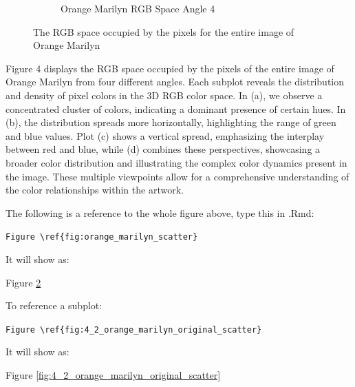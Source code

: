 \documentclass{article}
\begin{document}
\begin{figure}[ht]
\begin{subfigure}{0.24\textwidth}
    \caption{Orange Marilyn RGB Space Angle 4}
    \label{fig:4_4_orange_marilyn_original_scatter}
  \end{subfigure}
  \caption{The RGB space occupied by the pixels for the entire image of Orange Marilyn}
  \label{fig:orange_marilyn_scatter}
\end{figure}

Figure 4 displays the RGB space occupied by the pixels of the entire
image of Orange Marilyn from four different angles. Each subplot reveals
the distribution and density of pixel colors in the 3D RGB color space.
In (a), we observe a concentrated cluster of colors, indicating a
dominant presence of certain hues. In (b), the distribution spreads more
horizontally, highlighting the range of green and blue values. Plot (c)
shows a vertical spread, emphasizing the interplay between red and blue,
while (d) combines these perspectives, showcasing a broader color
distribution and illustrating the complex color dynamics present in the
image. These multiple viewpoints allow for a comprehensive understanding
of the color relationships within the artwork.

The following is a reference to the whole figure above, type this in
.Rmd:

\texttt{Figure\ \textbackslash{}ref\{fig:orange\_marilyn\_scatter\}}

It will show as:

Figure \ref{fig:orange_marilyn_scatter}

To reference a subplot:

\texttt{Figure\ \textbackslash{}ref\{fig:4\_2\_orange\_marilyn\_original\_scatter\}}

It will show as:

Figure \ref{fig:4_2_orange_marilyn_original_scatter}
\end{document}
